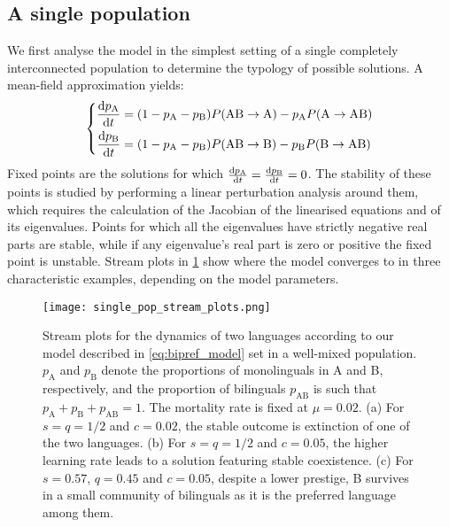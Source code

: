 \documentclass[../thesis.tex]{subfiles}
\begin{document}
\subsection{A single population}
\label{sec:multiling_mean_field}
We first analyse the model  in the
simplest setting of a single completely interconnected population to determine the
typology of possible solutions. A mean-field approximation yields:
\begin{equation}
  \label{eq:dt_bipref_model}
  \left\{
  \begin{aligned}
    \dv{p_\text{A}}{t} &= (1 - p_\text{A} - p_\text{B}) P (\text{AB} \rightarrow \text{A})
        - p_\text{A} P (\text{A} \rightarrow \text{AB})
    \\
    \dv{p_\text{B}}{t} &= (1 - p_\text{A} - p_\text{B}) P (\text{AB} \rightarrow \text{B})
        - p_\text{B} P (\text{B} \rightarrow \text{AB})
  \end{aligned}
    \right.
\end{equation}
Fixed points are the solutions for which $\dv{p_\text{A}}{t} = \dv{p_\text{B}}{t} = 0$.
The stability of these points is studied by performing a linear perturbation analysis
around them, which requires the calculation of the Jacobian of the linearised equations
and of its eigenvalues. Points for which all the eigenvalues have strictly negative real
parts are stable, while if any eigenvalue's real part is zero or positive the fixed
point is unstable. Stream plots in \cref{fig:stream_plots} show where the model
converges to in three characteristic examples, depending on the model parameters.
\begin{figure}[b!]
  \centering
  \texttt{[image: single\_pop\_stream\_plots.png]}
  \caption{Stream plots for the dynamics of two languages according to our model
  described in \cref{eq:bipref_model} set in a well-mixed population. $p_{\text{A}}$
  and $p_{\text{B}}$ denote the proportions of monolinguals in A and B, respectively,
  and the proportion of bilinguals $p_{\text{AB}}$ is such that $p_{\text{A}} +
  p_{\text{B}} + p_{\text{AB}} = 1$. The mortality rate is fixed at $\mu = 0.02$. (a)
  For $s = q = 1/2$ and $c=0.02$, the stable outcome is extinction of one of the two
  languages. (b) For $s = q = 1/2$ and $c = 0.05$, the higher learning rate leads to a
  solution featuring stable coexistence. (c) For $s = 0.57$, $q = 0.45$ and $c =
  0.05$, despite a lower prestige, B survives in a small community of bilinguals as
  it is the preferred language among them.}
  \label{fig:stream_plots}
\end{figure}
\end{document}
